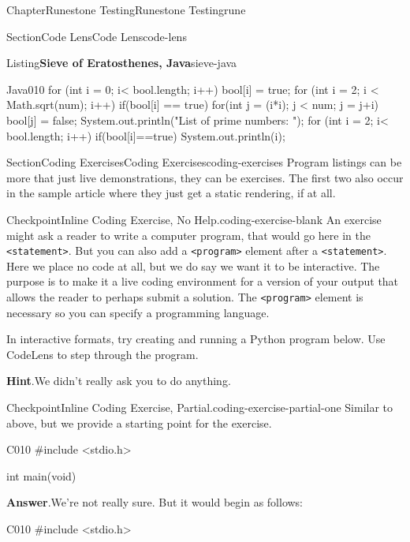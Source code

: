 \documentclass[oneside,10pt,]{book}
\newcommand{\blocktitlefont}{\relax}
\newcommand{\mono}[1]{\texttt{#1}}
\numberwithin{equation}{section}
\begin{document}
\begin{chapterptx}{Chapter}{Runestone Testing}{}{Runestone Testing}{}{}{rune}
\begin{sectionptx}{Section}{Code Lens}{}{Code Lens}{}{}{code-lens}
\begin{listingptx}{Listing}{\textbf{Sieve of Eratosthenes\protect\footnotemark{}, Java}}{sieve-java}{}
\begin{program}{Java}{0}{1}{0}
{{      for (int i = 0; i< bool.length; i++) {
         bool[i] = true;
      }
      for (int i = 2; i < Math.sqrt(num); i++) {
         if(bool[i] == true) {
            for(int j = (i*i); j < num; j = j+i) {
               bool[j] = false;
            }
         }
      }
      System.out.println("List of prime numbers: ");
      for (int i = 2; i< bool.length; i++) {
         if(bool[i]==true) {
            System.out.println(i);
         }
      }
   }
}
\end{program}
\end{listingptx}%
%
\end{sectionptx}
%
%
\typeout{************************************************}
\typeout{************************************************}
%
\begin{sectionptx}{Section}{Coding Exercises}{}{Coding Exercises}{}{}{coding-exercises}
Program listings can be more that just live demonstrations, they can be exercises.  The first two also occur in the sample article where they just get a static rendering, if at all.%
\begin{inlineexercise}{Checkpoint}{Inline Coding Exercise, No Help.}{coding-exercise-blank}%
An exercise might ask a reader to write a computer program, that would go here in the \mono{<statement>}.  But you can also add a \mono{<program>} element after a \mono{<statement>}.  Here we place no code at all, but we do say we want it to be interactive.  The purpose is to make it a live coding environment for a version of your output that allows the reader to perhaps submit a solution.  The \mono{<program>} element is necessary so you can specify a programming language.%
\par
In interactive formats, try creating and running a Python program below.  Use CodeLens to step through the program.%
\par\smallskip%
\noindent\textbf{\blocktitlefont Hint}.\hypertarget{coding-exercise-blank-3}{}\quad{}We didn't really ask you to do anything.%
\end{inlineexercise}%
\begin{inlineexercise}{Checkpoint}{Inline Coding Exercise, Partial.}{coding-exercise-partial-one}%
Similar to above, but we provide a starting point for the exercise.%
\begin{program}{C}{0}{1}{0}
#include <stdio.h>

int main(void)
\end{program}
\par\smallskip%
\noindent\textbf{\blocktitlefont Answer}.\hypertarget{coding-exercise-partial-one-3}{}\quad{}We're not really sure.  But it would begin as follows:%
\begin{program}{C}{0}{1}{0}
#include <stdio.h>


\end{program}
\end{inlineexercise}
\end{sectionptx}
\end{chapterptx}
\end{document}
